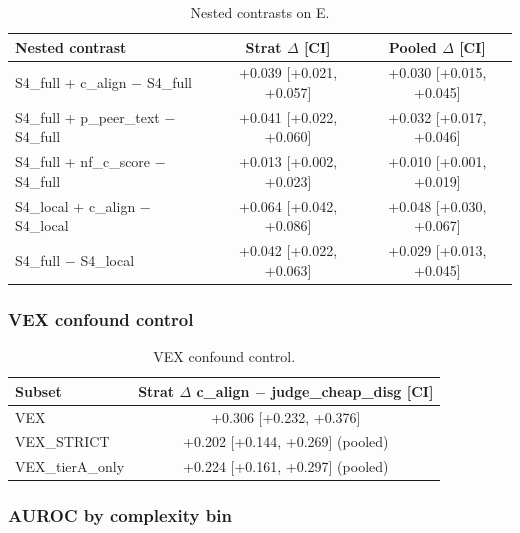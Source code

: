 \documentclass[11pt,letterpaper]{article}
\begin{document}
\begin{table}[!htbp]
\centering
\caption{Nested contrasts on E.}
\label{tab:nested_contrasts}
\begin{tabular}{lcc}
\toprule
Nested contrast & Strat $\Delta$ [CI] & Pooled $\Delta$ [CI] \\
\midrule
S4\_full + c\_align $-$ S4\_full & +0.039 [+0.021, +0.057] & +0.030 [+0.015, +0.045] \\
S4\_full + p\_peer\_text $-$ S4\_full & +0.041 [+0.022, +0.060] & +0.032 [+0.017, +0.046] \\
S4\_full + nf\_c\_score $-$ S4\_full & +0.013 [+0.002, +0.023] & +0.010 [+0.001, +0.019] \\
S4\_local + c\_align $-$ S4\_local & +0.064 [+0.042, +0.086] & +0.048 [+0.030, +0.067] \\
S4\_full $-$ S4\_local & +0.042 [+0.022, +0.063] & +0.029 [+0.013, +0.045] \\
\bottomrule
\end{tabular}
\end{table}

\subsubsection{VEX confound control}

\begin{table}[!htbp]
\centering
\caption{VEX confound control.}
\label{tab:vex}
\begin{tabular}{lc}
\toprule
Subset & Strat $\Delta$ c\_align $-$ judge\_cheap\_disg [CI] \\
\midrule
VEX & +0.306 [+0.232, +0.376] \\
VEX\_STRICT & +0.202 [+0.144, +0.269] (pooled) \\
VEX\_tierA\_only & +0.224 [+0.161, +0.297] (pooled) \\
\bottomrule
\end{tabular}
\end{table}

\subsubsection{AUROC by complexity bin}
\end{document}
